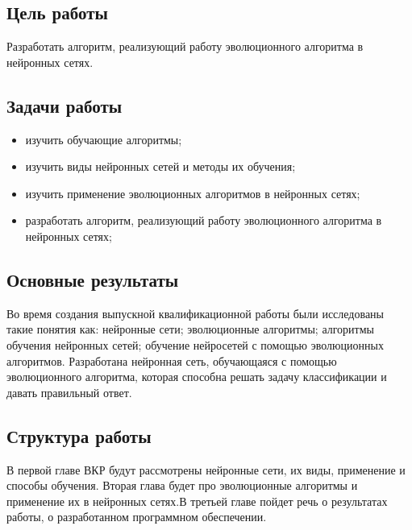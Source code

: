 \subsection*{Цель работы}
Разработать алгоритм, реализующий работу эволюционного алгоритма в нейронных сетях.

\subsection*{Задачи работы}
\begin{itemize}
	\item изучить обучающие алгоритмы;
	\item изучить виды нейронных сетей и методы их обучения;
	\item изучить применение эволюционных алгоритмов в нейронных сетях;
	\item разработать алгоритм, реализующий работу эволюционного 
  алгоритма в нейронных сетях;
\end{itemize}


\subsection*{Основные результаты}
Во время создания выпускной квалификационной работы были исследованы такие понятия как:
нейронные сети;
эволюционные алгоритмы;
алгоритмы обучения нейронных сетей;
обучение нейросетей с помощью эволюционных алгоритмов.
Разработана нейронная сеть, обучающаяся с помощью эволюционного алгоритма, которая способна решать задачу классификации и давать правильный ответ.

\subsection*{Структура работы}
В первой главе ВКР будут рассмотрены нейронные сети, их виды, применение и способы обучения. Вторая глава будет про эволюционные алгоритмы и применение их в нейронных сетях.В третьей главе пойдет речь о результатах работы, о разработанном программном обеспечении.
